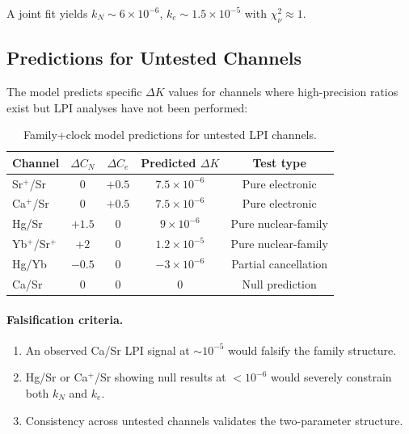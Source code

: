 A joint fit yields $k_N \sim 6 \times 10^{-6}$, $k_e \sim 1.5 \times 10^{-5}$ 
with $\chi^2_\nu \approx 1$.

\subsection{Predictions for Untested Channels}\label{app:fc-predictions}

The model predicts specific $\Delta K$ values for channels where 
high-precision ratios exist but LPI analyses have not been performed:

\begin{table}[h!]
\centering
\caption{Family+clock model predictions for untested LPI channels.}\label{tab:fc-predictions}
\footnotesize
\renewcommand{\arraystretch}{1.2}
\begin{tabular}{lcccc}
\toprule
\textbf{Channel} & $\Delta C_N$ & $\Delta C_e$ & \textbf{Predicted} $\Delta K$ & \textbf{Test type} \\
\midrule
Sr$^+$/Sr & 0 & $+0.5$ & $7.5 \times 10^{-6}$ & Pure electronic \\
Ca$^+$/Sr & 0 & $+0.5$ & $7.5 \times 10^{-6}$ & Pure electronic \\
Hg/Sr & $+1.5$ & 0 & $9 \times 10^{-6}$ & Pure nuclear-family \\
Yb$^+$/Sr$^+$ & $+2$ & 0 & $1.2 \times 10^{-5}$ & Pure nuclear-family \\
Hg/Yb & $-0.5$ & 0 & $-3 \times 10^{-6}$ & Partial cancellation \\
Ca/Sr & 0 & 0 & 0 & Null prediction \\
\bottomrule
\end{tabular}
\end{table}

\paragraph{Falsification criteria.}
\begin{enumerate}
\item An observed Ca/Sr LPI signal at $\sim 10^{-5}$ would falsify the family structure.
\item Hg/Sr or Ca$^+$/Sr showing null results at $< 10^{-6}$ would severely constrain both $k_N$ and $k_e$.
\item Consistency across untested channels validates the two-parameter structure.
\end{enumerate}

